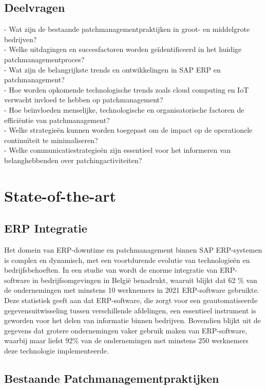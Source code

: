 \subsection{Deelvragen}
- Wat zijn de bestaande patchmanagementpraktijken in groot- en middelgrote bedrijven? \\
- Welke uitdagingen en succesfactoren worden geïdentificeerd in het huidige patchmanagementproces? \\
- Wat zijn de belangrijkste trends en ontwikkelingen in SAP ERP en patchmanagement? \\
- Hoe worden opkomende technologische trends zoals cloud computing en IoT verwacht invloed te hebben op patchmanagement? \\
- Hoe beïnvloeden menselijke, technologische en organisatorische factoren de efficiëntie van patchmanagement? \\
- Welke strategieën kunnen worden toegepast om de impact op de operationele continuïteit te minimaliseren? \\
- Welke communicatiestrategieën zijn essentieel voor het informeren van belanghebbenden over patchingactiviteiten? \\

\section{State-of-the-art}%
\label{sec:state-of-the-art}

\subsection{ERP Integratie}
Het domein van ERP-downtime en patchmanagement binnen SAP ERP-systemen is complex en dynamisch, met een voortdurende evolutie van technologieën en bedrijfsbehoeften. In een studie van \autocite{StatistiekVlaanderen2022} wordt de enorme integratie van ERP-software in bedrijfsomgevingen in België benadrukt, waaruit blijkt dat 62 \% van de ondernemingen met minstens 10 werknemers in 2021 ERP-software gebruikte. Deze statistiek geeft aan dat ERP-software, die zorgt voor een geautomatiseerde gegevensuitwisseling tussen verschillende afdelingen, een essentieel instrument is geworden voor het delen van informatie binnen bedrijven. Bovendien blijkt uit de gegevens dat grotere ondernemingen vaker gebruik maken van ERP-software, waarbij maar liefst 92\% van de ondernemingen met minstens 250 werknemers deze technologie implementeerde.

\subsection{Bestaande Patchmanagementpraktijken}

